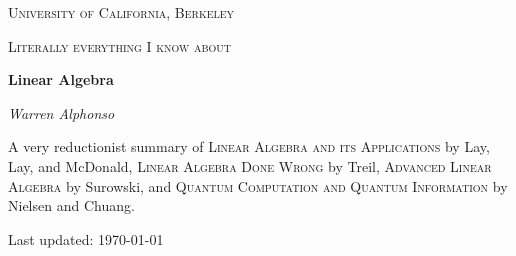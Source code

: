 \documentclass[a4paper,10pt]{book}
\theoremstyle{plain}
\theoremstyle{plain}
\theoremstyle{definition}
\begin{document}
\frontmatter 
{\let\cleardoublepage\clearpage 

\begin{titlepage}
	\centering
	\vspace{1cm}
	{\scshape\LARGE University of California, Berkeley \par}
	\vspace{4cm}
	{\scshape\Large Literally everything I know about \par}
	\vspace{1.5cm}
	{\Huge\bfseries Linear Algebra\par}
	\vspace{1cm}
	\vspace{2.5cm}
	{\Large\itshape Warren Alphonso\par}
	\vfill
	{\large A very reductionist summary of \textsc{Linear Algebra and its Applications} by Lay, Lay, and McDonald, \textsc{Linear Algebra Done Wrong} by Treil, \textsc{Advanced Linear Algebra} by Surowski, and \textsc{Quantum Computation and Quantum Information} by Nielsen and Chuang. \par}
	\vfill
	{\large Last updated: \today \par}
\end{titlepage}

\tableofcontents
}

\mainmatter










\end{document}
